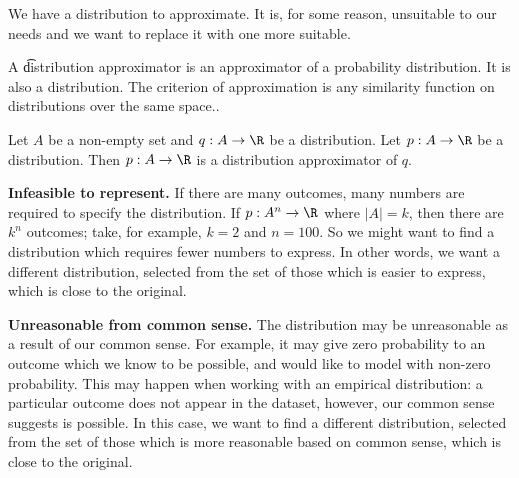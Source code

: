 

We have a distribution to approximate.
It is, for some reason, unsuitable to our needs and we want to replace it with one more suitable.


A \t{distribution approximator} is an approximator of a probability distribution.
It is also a distribution.
The criterion of approximation is any similarity function on distributions over the same space..


Let $A$ be a non-empty set and $q: A \to \R$ be a distribution.
Let $p: A \to \R$ be a distribution.
Then $p: A \to \R$ is a distribution approximator of $q$.



\textbf{Infeasible to represent.}
If there are many outcomes, many numbers are required to specify the distribution.
If $p: A^n \to \R$ where $|A| = k$, then there are $k^n$ outcomes; take, for example, $k = 2$ and $n = 100$.
So we might want to find a distribution which requires fewer numbers to express.
In other words, we want a different distribution, selected from the set of those which is easier to express, which is close to the original.

\textbf{Unreasonable from common sense.}
The distribution may be unreasonable as a result of our common sense.
For example, it may give zero probability to an outcome which we know to be possible, and would like to model with non-zero probability.
This may happen when working with an empirical distribution: a particular outcome does not appear in the dataset, however, our common sense suggests is possible.
In this case, we want to find a different distribution, selected from the set of those which is more reasonable based on common sense, which is close to the original.
